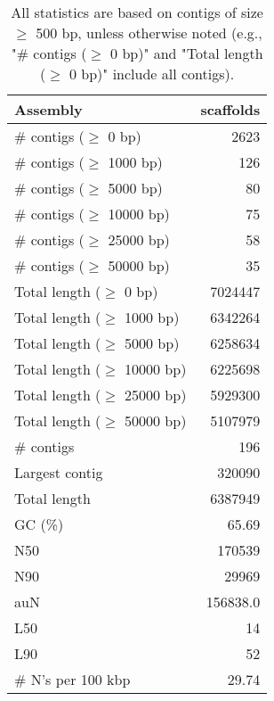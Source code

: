 \documentclass[12pt,a4paper]{article}
\begin{document}
\begin{table}[ht]
\begin{center}
\caption{All statistics are based on contigs of size $\geq$ 500 bp, unless otherwise noted (e.g., "\# contigs ($\geq$ 0 bp)" and "Total length ($\geq$ 0 bp)" include all contigs).}
\begin{tabular}{|l*{1}{|r}|}
\hline
Assembly & scaffolds \\ \hline
\# contigs ($\geq$ 0 bp) & 2623 \\ \hline
\# contigs ($\geq$ 1000 bp) & 126 \\ \hline
\# contigs ($\geq$ 5000 bp) & 80 \\ \hline
\# contigs ($\geq$ 10000 bp) & 75 \\ \hline
\# contigs ($\geq$ 25000 bp) & 58 \\ \hline
\# contigs ($\geq$ 50000 bp) & 35 \\ \hline
Total length ($\geq$ 0 bp) & 7024447 \\ \hline
Total length ($\geq$ 1000 bp) & 6342264 \\ \hline
Total length ($\geq$ 5000 bp) & 6258634 \\ \hline
Total length ($\geq$ 10000 bp) & 6225698 \\ \hline
Total length ($\geq$ 25000 bp) & 5929300 \\ \hline
Total length ($\geq$ 50000 bp) & 5107979 \\ \hline
\# contigs & 196 \\ \hline
Largest contig & 320090 \\ \hline
Total length & 6387949 \\ \hline
GC (\%) & 65.69 \\ \hline
N50 & 170539 \\ \hline
N90 & 29969 \\ \hline
auN & 156838.0 \\ \hline
L50 & 14 \\ \hline
L90 & 52 \\ \hline
\# N's per 100 kbp & 29.74 \\ \hline
\end{tabular}
\end{center}
\end{table}
\end{document}
